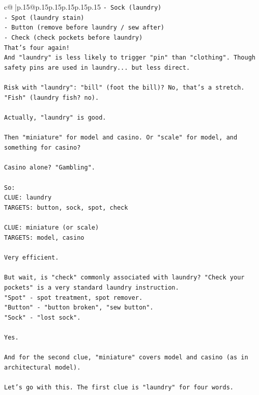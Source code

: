 \documentclass{article}
\begin{document}
{\begin{supertabular}{c@{$\;$}|p{.15\linewidth}@{}p{.15\linewidth}p{.15\linewidth}p{.15\linewidth}p{.15\linewidth}p{.15\linewidth}}
{{{\texttt{{-} Sock (laundry)} \\
\texttt{{-} Spot (laundry stain)} \\
\texttt{{-} Button (remove before laundry / sew after)} \\
\texttt{{-} Check (check pockets before laundry)} \\
\texttt{That's four again!} \\
\texttt{And "laundry" is less likely to trigger "pin" than "clothing". Though safety pins are used in laundry... but less direct.} \\
\\ 
\texttt{Risk with "laundry": "bill" (foot the bill)? No, that's a stretch. "Fish" (laundry fish? no).} \\
\\ 
\texttt{Actually, "laundry" is good.} \\
\\ 
\texttt{Then "miniature" for model and casino. Or "scale" for model, and something for casino?} \\
\\ 
\texttt{Casino alone? "Gambling".} \\
\\ 
\texttt{So:} \\
\texttt{CLUE: laundry} \\
\texttt{TARGETS: button, sock, spot, check} \\
\\ 
\texttt{CLUE: miniature (or scale)} \\
\texttt{TARGETS: model, casino} \\
\\ 
\texttt{Very efficient.} \\
\\ 
\texttt{But wait, is "check" commonly associated with laundry? "Check your pockets" is a very standard laundry instruction.} \\
\texttt{"Spot" {-} spot treatment, spot remover.} \\
\texttt{"Button" {-} "button broken", "sew button".} \\
\texttt{"Sock" {-} "lost sock".} \\
\\ 
\texttt{Yes.} \\
\\ 
\texttt{And for the second clue, "miniature" covers model and casino (as in architectural model).} \\
\\ 
\texttt{Let's go with this. The first clue is "laundry" for four words.} \\
}}}
\end{supertabular}}
\end{document}
